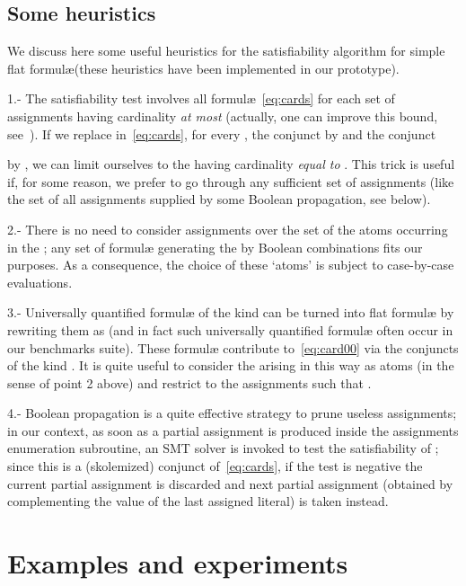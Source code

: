 \documentclass[11pt,a4paper]{article}
\newcommand{\formulae}{formul\ae\xspace}
\begin{document}
{\subsection{ Some heuristics}\label{subsec:heuristics}
We discuss here some useful heuristics for  the satisfiability algorithm for simple flat \formulae (these heuristics have been implemented in our prototype).


1.- The satisfiability test involves all \formulae~\eqref{eq:cards} for each set of assignments  having cardinality \emph{at most}    
(actually, one can improve this bound, see~\cite{cade21}). If we replace in~\eqref{eq:cards}, for every , the conjunct 
 by  and the conjunct

by
, 
we can limit ourselves to the  having cardinality \emph{equal to} . This trick is useful if, for some reason, we prefer to go through any sufficient set of assignments (like  the set of all assignments supplied by some Boolean propagation, see below).

2.- There is no need to consider assignments  over the set of the atoms  occurring in the ; any set of \formulae generating the  by 
Boolean combinations fits our purposes. As a consequence, the choice of these
`atoms' is subject to case-by-case evaluations.

3.- Universally quantified \formulae of the kind  can be turned into flat \formulae by rewriting them as
 (and in fact such universally quantified \formulae often occur in our benchmarks suite).
 These \formulae contribute to~\eqref{eq:card00} via the conjuncts of the kind
. It is quite useful to
consider the  arising in this way as atoms (in the sense of point 2 above) and restrict to the assignments  
such that . 

4.- Boolean propagation is a quite effective strategy to prune useless assignments; in our context, as soon as a partial assignment  is produced inside the assignments enumeration subroutine, 
an SMT solver is invoked to test the satisfiability of 
; since this is a (skolemized) conjunct of~\eqref{eq:cards}, if 
the test is negative the current partial assignment is discarded and next partial assignment (obtained by complementing the value of the last assigned literal) is taken instead.


\section{Examples and experiments}\label{sec:experiments}

}
\end{document}
